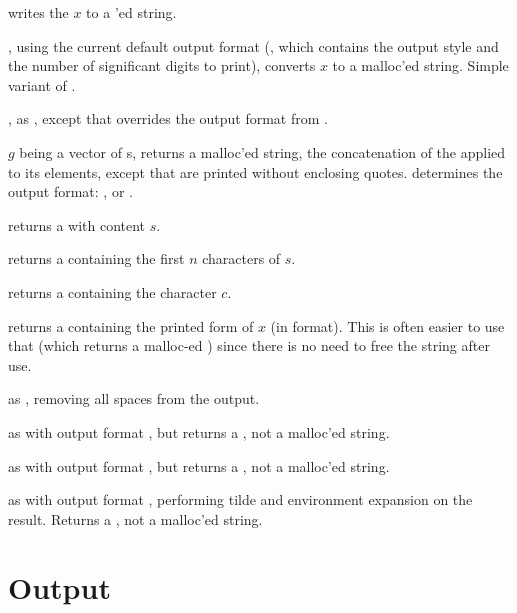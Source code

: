  writes the  $x$ to a 'ed
string.

, using the current default output format
(, which contains the output style and the number of
significant digits to print), converts $x$ to a malloc'ed string. Simple
variant of .

, as , except that
 overrides the output format from .

 $g$ being a vector of s,
returns a malloc'ed string, the concatenation of the  applied
to its elements, except that  are printed without enclosing quotes.
 determines the output format: , 
or .


 returns a  with content $s$.

returns a  containing the first $n$ characters of $s$.

 returns a  containing the character
$c$.

 returns a  containing the printed
form of $x$ (in  format). This is often easier to use that
 (which returns a malloc-ed ) since there is no need
to free the string after use.

 as , removing all
spaces from the output.

 as  with output format ,
but returns a , not a malloc'ed string.

 as  with output format ,
but returns a , not a malloc'ed string.

 as  with output format ,
performing tilde and environment expansion on the result. Returns a
, not a malloc'ed string.

\section{Output}


